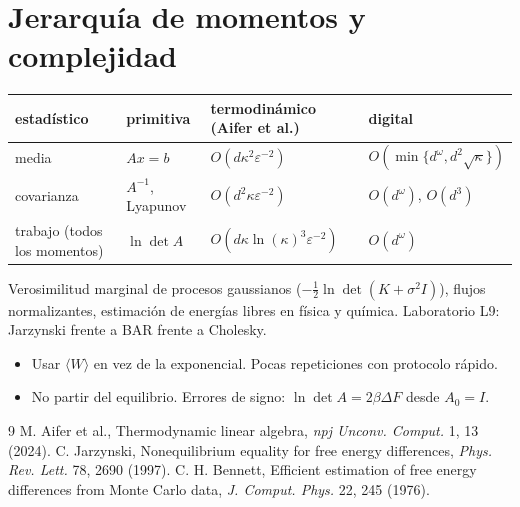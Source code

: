 \documentclass[11pt,a4paper]{article}
\begin{document}
\section{Jerarquía de momentos y complejidad}
\begin{center}\small\begin{tabular}{llll}\toprule
estadístico & primitiva & termodinámico (Aifer et al.) & digital\\\midrule
media & $Ax=b$ & $O(d\kappa^2\varepsilon^{-2})$ & $O(\min\{d^\omega,d^2\sqrt\kappa\})$\\
covarianza & $A^{-1}$, Lyapunov & $O(d^2\kappa\varepsilon^{-2})$ & $O(d^\omega)$, $O(d^3)$\\
trabajo (todos los momentos) & $\ln\det A$ & $O(d\kappa\ln(\kappa)^3\varepsilon^{-2})$ & $O(d^\omega)$\\\bottomrule\end{tabular}\end{center}

\begin{aplicacion}
Verosimilitud marginal de procesos gaussianos ($-\tfrac12\ln\det(K+\sigma^2I)$), flujos normalizantes, estimación de energías libres en física y química.
Laboratorio L9: Jarzynski frente a BAR frente a Cholesky.
\end{aplicacion}

\begin{error}
\begin{itemize}[nosep]
\item Usar $\langle W\rangle$ en vez de la exponencial. \quad Pocas repeticiones con protocolo rápido.
\item No partir del equilibrio. \quad Errores de signo: $\ln\det A=2\beta\Delta F$ desde $A_0=I$.
\end{itemize}
\end{error}

\begin{thebibliography}{9}\small
{} M. Aifer et al., Thermodynamic linear algebra, \emph{npj Unconv. Comput.} 1, 13 (2024).
 C. Jarzynski, Nonequilibrium equality for free energy differences, \emph{Phys. Rev. Lett.} 78, 2690 (1997).
 C. H. Bennett, Efficient estimation of free energy differences from Monte Carlo data, \emph{J. Comput. Phys.} 22, 245 (1976).
\end{thebibliography}
\end{document}
